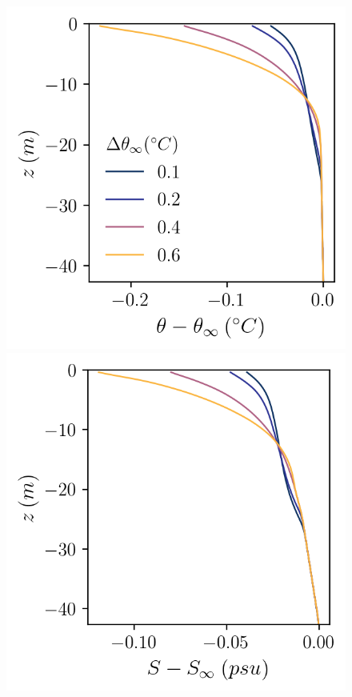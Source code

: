 \documentclass[draft]{agujournal2019}
\begin{document}
\begin{figure}[h!]
    \centering
    \begin{minipage}{0.33\textwidth}
        \includegraphics[trim={0 0 0 0},clip, width=\textwidth]{Figures/pt_cmp_dT_43h_tav13h_z_profile.png}
    \end{minipage}%
    \begin{minipage}{0.33\textwidth}
        \includegraphics[trim={0 0 0 0},clip, width=\textwidth]{Figures/sa_cmp_dT_43h_tav13h_z_profile.png}

\end{minipage}
\end{figure}
\end{document}
